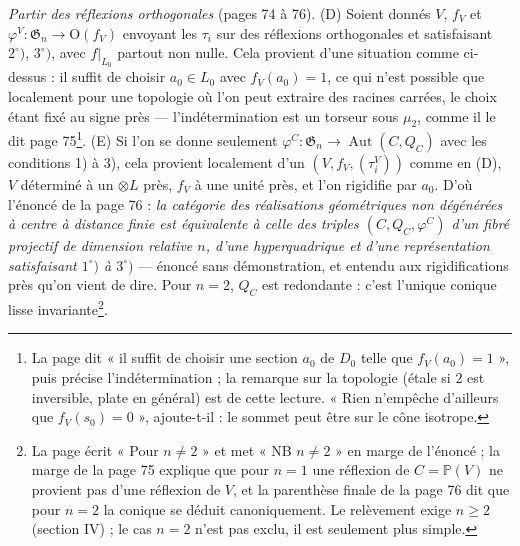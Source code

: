 \documentclass[11pt,a4paper]{article}
\begin{document}
\emph{Partir des réflexions orthogonales} (pages 74 à 76). (D) Soient donnés
$V$, $f_V$ et $\varphi^V \colon \mathfrak{G}_n \to \mathrm{O}(f_V)$ envoyant les
$\tau_i$ sur des réflexions orthogonales et satisfaisant $2^\circ)$, $3^\circ)$,
avec $f|_{L_0}$ partout non nulle. Cela provient d'une situation comme ci-dessus :
il suffit de choisir $a_0 \in L_0$ avec $f_V(a_0) = 1$, ce qui n'est possible
que localement pour une topologie où l'on peut extraire des racines carrées, le
choix étant fixé au signe près --- l'indétermination est un torseur sous
$\mu_2$, comme il le dit page 75\footnote{La page dit « il suffit de choisir une
section $a_0$ de $D_0$ telle que $f_V(a_0) = 1$ », puis précise
l'indétermination ; la remarque sur la topologie (étale si $2$ est inversible,
plate en général) est de cette lecture. « Rien n'empêche d'ailleurs que $f_V(s_0)
= 0$ », ajoute-t-il : le sommet peut être sur le cône isotrope.}. (E) Si l'on se
donne seulement $\varphi^C \colon \mathfrak{G}_n \to \operatorname{Aut}(C, Q_C)$
avec les conditions 1) à 3), cela provient localement d'un $(V, f_V,
(\tau_i^V))$ comme en (D), $V$ déterminé à un $\otimes L$ près, $f_V$ à une
unité près, et l'on rigidifie par $a_0$. D'où l'énoncé de la page 76 :
\emph{la catégorie des réalisations géométriques non dégénérées à centre à
distance finie est équivalente à celle des triples $(C, Q_C, \varphi^C)$ d'un
fibré projectif de dimension relative $n$, d'une hyperquadrique et d'une
représentation satisfaisant $1^\circ)$ à $3^\circ)$} --- énoncé sans
démonstration, et entendu aux rigidifications près qu'on vient de dire. Pour $n
= 2$, $Q_C$ est redondante : c'est l'unique conique lisse invariante\footnote{La
page écrit « Pour $n \neq 2$ » et met « NB $n \neq 2$ » en marge de l'énoncé ; la
marge de la page 75 explique que pour $n = 1$ une réflexion de $C =
\mathbb{P}(V)$ ne provient pas d'une réflexion de $V$, et la parenthèse finale de
la page 76 dit que pour $n = 2$ la conique se déduit canoniquement. Le
relèvement exige $n \geqslant 2$ (section IV) ; le cas $n = 2$ n'est pas
exclu, il est seulement plus simple.}.
\end{document}
